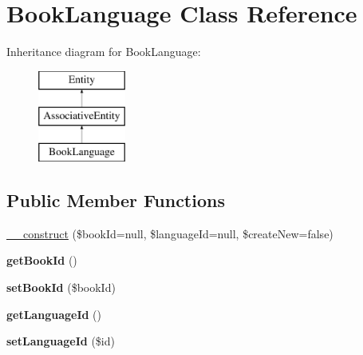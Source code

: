 \hypertarget{classBookLanguage}{
\section{BookLanguage Class Reference}
\label{classBookLanguage}
}
Inheritance diagram for BookLanguage:\begin{figure}[H]
\begin{center}
\leavevmode
\includegraphics[height=3.000000cm]{classBookLanguage}
\end{center}
\end{figure}
\subsection*{Public Member Functions}
\begin{DoxyCompactItemize}
\item 
\hyperlink{classBookLanguage_a244f8af6147e237845222422611bf08f}{\_\-\_\-construct} (\$bookId=null, \$languageId=null, \$createNew=false)
\item 
\hypertarget{classBookLanguage_ae0a6dbbcc16626c4eda99ebccc090781}{
{\bfseries getBookId} ()}
\label{classBookLanguage_ae0a6dbbcc16626c4eda99ebccc090781}

\item 
\hypertarget{classBookLanguage_a4d9295cfd5bcdc8a0e648194404d1bcc}{
{\bfseries setBookId} (\$bookId)}
\label{classBookLanguage_a4d9295cfd5bcdc8a0e648194404d1bcc}

\item 
\hypertarget{classBookLanguage_ab573677e431d72216d45a4cf3e248de4}{
{\bfseries getLanguageId} ()}
\label{classBookLanguage_ab573677e431d72216d45a4cf3e248de4}

\item 
\hypertarget{classBookLanguage_ab8544234c7f5b5691ec471022bed143f}{
{\bfseries setLanguageId} (\$id)}
\label{classBookLanguage_ab8544234c7f5b5691ec471022bed143f}

\end{DoxyCompactItemize}
